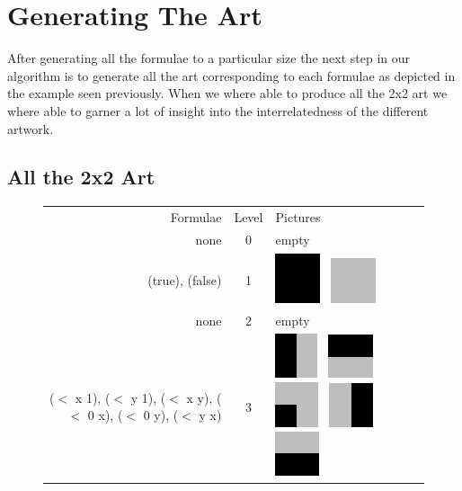 \documentclass[11pt]{article}
\begin{document}
\section{Generating The Art}

After generating all the formulae to a particular size the next step in our algorithm is
to generate all the art corresponding to each formulae as depicted in the example seen
previously. When we where able to produce all the 2x2 art we where able to garner a lot of
insight into the interrelatedness of the different artwork.

\subsection{All the 2x2 Art}
\begin{figure}
\begin{center}
\begin{tabular}{r c l}
Formulae & Level & Pictures \\
\tiny{none} & 0 & empty \\
\tiny{(true), (false)} & 1 &
    \includegraphics[width=.25in]{../presentation/2x2/Shape1LVL1.png}~
    \includegraphics[width=.25in]{../presentation/2x2/Shape2LVL1.png} \\
\tiny{none} & 2 & empty \\
\tiny{($<$ x 1), ($<$ y 1), ($<$ x y), ($<$ 0 x), ($<$ 0 y), ($<$ y x)} & 3 & 
    \includegraphics[width=.25in]{../presentation/2x2/Shape1LVL3.png}~
    \includegraphics[width=.25in]{../presentation/2x2/Shape2LVL3.png}~
    \includegraphics[width=.25in]{../presentation/2x2/Shape5LVL3.png}~
    \includegraphics[width=.25in]{../presentation/2x2/Shape6LVL3.png}~
    \includegraphics[width=.25in]{../presentation/2x2/Shape3LVL3.png}~

\end{tabular}
\end{center}
\end{figure}
\end{document}
